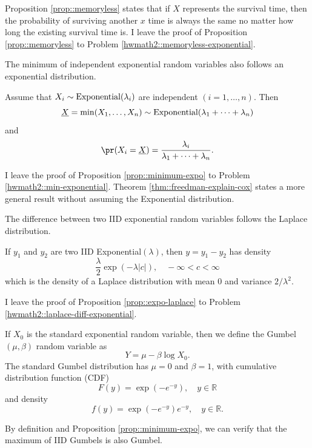 Proposition \ref{prop::memoryless} states that if $X$ represents the survival time, then the probability of surviving another $x$ time is always the same no matter how long the existing survival time is.  I leave the proof of Proposition \ref{prop::memoryless} to Problem \ref{hwmath2::memoryless-exponential}. 




The minimum of independent exponential random variables also follows an exponential distribution. 

\begin{proposition}
\label{prop::minimum-expo}
Assume that $X_{i}\sim\textup{Exponential}(\lambda_{i})$ are independent $(i=1,\ldots,n)$. Then
$$
\underline{X} = \min(X_{1},\ldots,X_{n} ) \sim  \textup{Exponential}(  \lambda_{1}+\cdots+\lambda_{n}  )
$$
and
\[
\pr (X_{i}=\underline{X}  ) =\frac{\lambda_{i}}{\lambda_{1}+\cdots+\lambda_{n}}.
\]
\end{proposition}


I leave the proof of Proposition \ref{prop::minimum-expo} to Problem \ref{hwmath2::min-exponential}. Theorem \ref{thm::freedman-explain-cox} states a more general result without assuming the Exponential distribution. 



The difference between two IID exponential random variables follows the Laplace distribution. 

\begin{proposition}
\label{prop::expo-laplace}
If $y_1$ and $y_2$ are two IID Exponential$(\lambda)$, then $y = y_1 - y_2$ has  density 
$$
 \frac{\lambda}{2}  \exp( - \lambda | c| ),\quad -\infty < c<\infty
$$ 
which is the density of a Laplace distribution with mean $0$ and variance $2/\lambda^2$. 
\end{proposition}


I leave the proof of Proposition \ref{prop::expo-laplace} to Problem \ref{hwmath2::laplace-diff-exponential}.


If $X_0 $ is the standard exponential random variable, then we define the Gumbel$(\mu, \beta)$ random variable as 
$$
Y = \mu - \beta \log X_0.
$$
The standard Gumbel distribution has $\mu =0$ and $\beta  =1$, with cumulative distribution function (CDF)
\[
F(y)=\exp(-e^{-y}),\quad y\in\mathbb{R}
\]
and density
\[
f(y)=\exp(-e^{-y})e^{-y},\quad y\in\mathbb{R}.
\]


By definition and Proposition \ref{prop::minimum-expo}, we can verify that the maximum of IID Gumbels is also Gumbel. 


